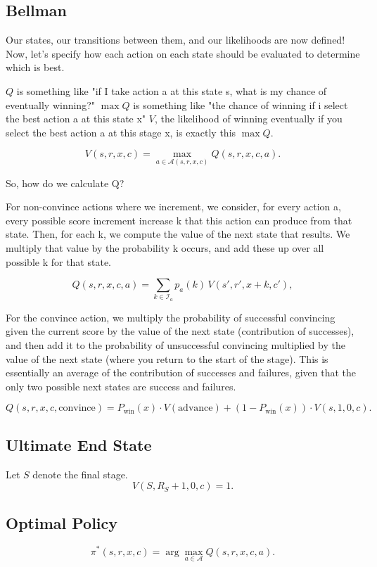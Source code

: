 \documentclass{article}
\begin{document}
\subsection{Bellman}

Our states, our transitions between them, and our likelihoods are now defined! 
Now, let's specify how each action on each state should be evaluated to determine 
which is best. 

$Q$ is something like "if I take action a at this state s, what is my chance of eventually winning?"
$\max Q$ is something like "the chance of winning if i select the best action a at this state x"
$V$, the likelihood of winning eventually if you select the best action a at this stage x, 
is exactly this $\max Q$. 

\[
V(s,r,x,c) = \max_{a \in \mathcal{A}(s,r,x,c)} Q(s,r,x,c,a).
\]

So, how do we calculate Q?

For non-convince actions where we increment, we consider, for every action a, every possible
score increment increase k that this action can produce from that state. 
Then, for each k, we compute the value of the next state 
that results. We multiply that value by the probability k occurs,
and add these up over all possible k for that state. 

\[
Q(s,r,x,c,a)
=
\sum_{k \in \mathcal{I}_a} p_a(k)\, V(s',r',x+k,c'),
\]

For the convince action, we multiply the probability of successful convincing given
the current score by the value of the next state (contribution of successes), and then add 
it to the probability of unsuccessful convincing multiplied by the value of the next state (where
you return to the start of the stage). This is essentially an average of the contribution
of successes and failures, given that the only two possible next states are success and failures. 

\[
Q(s,r,x,c,\text{convince})
=
P_{\text{win}}(x)\cdot V(\text{advance})
+
(1 - P_{\text{win}}(x))\cdot V(s,1,0,c).
\]

\subsection{Ultimate End State}

Let $S$ denote the final stage.
\[
V(S, R_S + 1, 0, c) = 1.
\]

\subsection{Optimal Policy}

\[
\pi^*(s,r,x,c)
=
\arg\max_{a \in \mathcal{A}} Q(s,r,x,c,a).
\]
\end{document}

